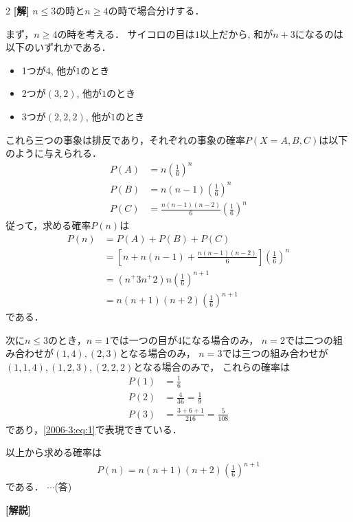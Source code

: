 \documentclass[../../../../main.tex]{subfiles}
\begin{document}
\setcounter{equation}{0}
\begin{oframed}
  
\end{oframed}
\setlength{\columnseprule}{0.4pt}
\begin{multicols}{2}
  {\bf[解]}
  $n \le 3$の時と$n \ge 4$の時で場合分けする．

  まず，$n \ge 4$の時を考える．
  サイコロの目は$1$以上だから, 和が$n+3$になるのは以下のいずれかである．
  \begin{itemize}
    \item[A] 1つが$4$, 他が$1$のとき
    \item[B] 2つが$(3,2)$, 他が$1$のとき
    \item[C] 3つが$(2,2,2)$, 他が$1$のとき
  \end{itemize}
  これら三つの事象は排反であり，それぞれの事象の確率$P(X=A,B,C)$は以下のように与えられる．
  \begin{align*}
    P(A) & = n\left(\frac{1}{6}\right)^n                     \\
    P(B) & = n(n-1)\left(\frac{1}{6}\right)^n                \\
    P(C) & = \frac{n(n-1)(n-2)}{6}\left(\frac{1}{6}\right)^n
  \end{align*}
  従って，求める確率$P(n)$は
  \begin{align}
    P(n)
     & = P(A)+P(B)+P(C)                                                             \\
     & = \left[n + n(n-1) + \frac{n(n-1)(n-2)}{6}\right] \left(\frac{1}{6}\right)^n \\
     & = \left(n^ + 3n^ + 2\right) n \left(\frac{1}{6}\right)^{n+1}                 \\
     & = n(n+1)(n+2) \left(\frac{1}{6}\right)^{n+1} \label{2006-3:eq:1}
  \end{align}
  である．

  \vspace{10pt}
  次に$n \le 3$のとき，$n=1$では一つの目が$4$になる場合のみ，
  $n=2$では二つの組み合わせが$(1,4),(2,3)$となる場合のみ，
  $n=3$では三つの組み合わせが$(1,1,4),(1,2,3),(2,2,2)$となる場合のみで，
  これらの確率は
  \begin{align*}
    P(1) & = \frac{1}{6}                       \\
    P(2) & = \frac{4}{36} = \frac{1}{9}        \\
    P(3) & = \frac{3+6+1}{216} = \frac{5}{108}
  \end{align*}
  であり，\cref{2006-3:eq:1}で表現できている．

  以上から求める確率は
  \begin{align*}
    P(n) = n(n+1)(n+2) \left(\frac{1}{6}\right)^{n+1}
  \end{align*}
  である． $\cdots$(答)

  \vspace{10pt}
  {\bf[解説]}



  \newpage
\end{multicols}
\end{document}
